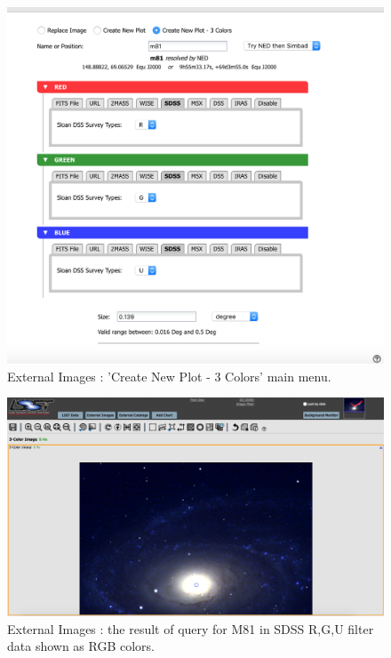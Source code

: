 \documentclass[DM,lsstdraft,toc,usenatbib]{lsstdoc}
\begin{document}
\begin{figure}
\includegraphics[width=\textwidth]{figs/external_images_rgb.png}
\caption{External Images : 'Create New Plot - 3 Colors' main menu.  }
\label{fig:ext_images_rgb}
\end{figure}

\begin{figure}
\includegraphics[width=\textwidth]{figs/external_images_rgb_query.png}
\caption{External Images :  the result of query for M81 in SDSS R,G,U filter data shown as RGB colors.}
\label{fig:ext_images_rgb_query}
\end{figure}
\end{document}
